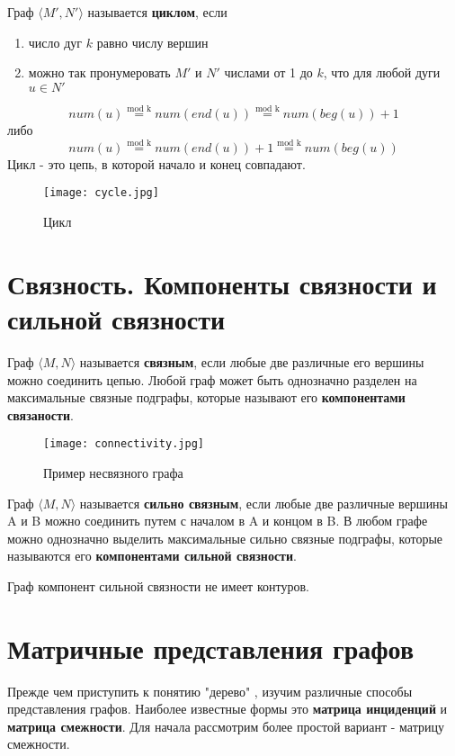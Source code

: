 \vspace{3mm}

Граф $\langle M', N'\rangle$ называется \textbf{циклом}, если
\begin{enumerate}
    \item число дуг $k$ равно числу вершин
    \item можно так пронумеровать $M'$ и $N'$ числами от 1 до $k$, что для любой дуги $u \in N'$
\end{enumerate}
\begin{equation}
    num(u) \stackrel{\text{mod k}}{=} num(end(u)) \stackrel{\text{mod k}}{=} num(beg(u)) + 1
\end{equation}
либо
\begin{equation}
    num(u) \stackrel{\text{mod k}}{=} num(end(u)) + 1 \stackrel{\text{mod k}}{=} num(beg(u))
\end{equation}
Цикл - это цепь, в которой начало и конец совпадают.
\begin{figure}[h]
    \centering 
    \texttt{[image: cycle.jpg]}
    \caption{Цикл}
\end{figure}

\section{Связность. Компоненты связности и сильной связности}
Граф $\langle M, N\rangle$ называется \textbf{связным}, если любые две различные его
вершины можно соединить цепью. Любой граф может быть однозначно разделен на максимальные
связные подграфы, которые называют его \textbf{компонентами связаности}.
\begin{figure}[h]
    \centering 
    \texttt{[image: connectivity.jpg]}
    \caption{Пример несвязного графа}
\end{figure}

Граф $\langle M, N\rangle$ называется \textbf{сильно связным}, если любые две различные
вершины A и B можно соединить путем с началом в A и концом в B. В любом графе можно однозначно
выделить максимальные сильно связные подграфы, которые называются его \textbf{компонентами сильной связности}.
\begin{thm}
    Граф компонент сильной связности не имеет контуров.
\end{thm}

\section{Матричные представления графов}
Прежде чем приступить к понятию "дерево" , изучим различные способы представления графов.
Наиболее известные формы это \textbf{матрица инциденций} и \textbf{матрица смежности}.
Для начала рассмотрим более простой вариант - матрицу смежности.

